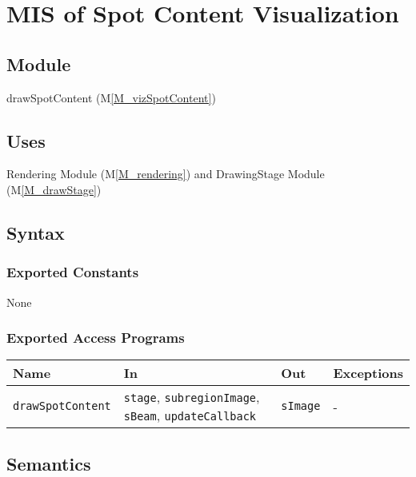 \documentclass[12pt, titlepage]{article}
\newcommand{\mref}[1]{M\ref{#1}}
\newcommand{\mrefp}[1]{(\mref{#1})}
\newcommand{\mreff}[1]{Module \mrefp{#1}}
\newcommand{\code}[1]{\texttt{#1}}
\begin{document}
\newpage



\section{MIS of Spot Content Visualization} \label{MS_vizSpotContent}

\subsection{Module}
drawSpotContent \mrefp{M_vizSpotContent}

\subsection{Uses}
Rendering \mreff{M_rendering} and DrawingStage \mreff{M_drawStage}

\subsection{Syntax}

\subsubsection{Exported Constants}
None
\subsubsection{Exported Access Programs}

\begin{center}
\begin{tabular}{p{4cm} p{5cm} p{4cm} p{2cm}}
\hline
\textbf{Name} & \textbf{In} & \textbf{Out} & \textbf{Exceptions} \\
\hline
\code{drawSpotContent} & \code{stage}, \code{subregionImage}, \code{sBeam}, \code{updateCallback}
  & \code{sImage} & - \\
\hline
\end{tabular}
\end{center}

\subsection{Semantics}
\end{document}

